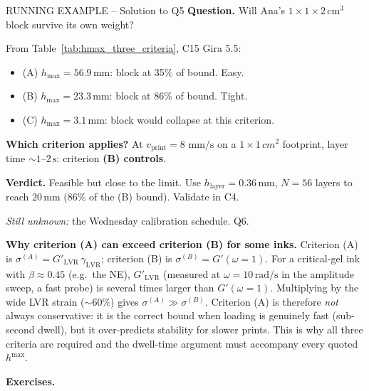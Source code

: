 \documentclass[11pt,a4paper]{article}
\newcommand{\mms}{\,\mathrm{mm/s}}
\begin{document}
\begin{runningbox}{RUNNING EXAMPLE -- Solution to Q5}
\textbf{Question.} Will Ana's $1\times 1\times 2$\,cm$^3$ block survive
its own weight?

\medskip From Table~\ref{tab:hmax_three_criteria}, C15 Gira 5.5:
\begin{itemize}[leftmargin=1.4em,itemsep=1pt]
\item (A) $h_\mathrm{max}=56.9\,\si{\mm}$: block at 35\% of bound. Easy.
\item (B) $h_\mathrm{max}=23.3\,\si{\mm}$: block at 86\% of bound. Tight.
\item (C) $h_\mathrm{max}=3.1\,\si{\mm}$: block would collapse at this
  criterion.
\end{itemize}
\textbf{Which criterion applies?} At $v_\mathrm{print}=8\,\mms$ on a
$1\times 1\,\si{cm^2}$ footprint, layer time $\sim 1$--$2\,\si{\s}$:
criterion \textbf{(B) controls}.

\textbf{Verdict.} Feasible but close to the limit. Use
$h_\mathrm{layer}=0.36\,\si{\mm}$, $N=56$ layers to reach 20\,\si{\mm}
(86\% of the (B) bound). Validate in C4.

\medskip\emph{Still unknown:} the Wednesday calibration schedule. Q6.
\end{runningbox}

\begin{goingdeeperbox}
\textbf{Why criterion (A) can exceed criterion (B) for some inks.}
Criterion (A) is $\sigma^{(A)}=G'_\mathrm{LVR}\,\gamma_\mathrm{LVR}$;
criterion (B) is $\sigma^{(B)}=G'(\omega=1)$.  For a critical-gel ink
with $\beta\approx 0.45$ (e.g.\ the NE), $G'_\mathrm{LVR}$ (measured at
$\omega=10\,\si{\radian\per\s}$ in the amplitude sweep, a fast probe) is
several times larger than $G'(\omega=1)$.  Multiplying by the wide LVR
strain ($\sim 60\%$) gives $\sigma^{(A)}\gg\sigma^{(B)}$.  Criterion (A)
is therefore \emph{not} always conservative: it is the correct bound when
loading is genuinely fast (sub-second dwell), but it over-predicts
stability for slower prints.  This is why all three criteria are required
and the dwell-time argument must accompany every quoted $h^{\max}$.
\end{goingdeeperbox}

\medskip\noindent\textbf{Exercises.}
\end{document}

